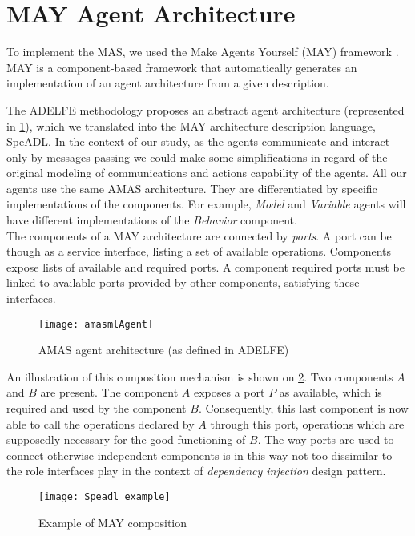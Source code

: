 \section{MAY Agent Architecture}

To implement the MAS, we used the Make Agents Yourself (MAY) framework  \cite{No2012.2}. MAY is a component-based framework that automatically generates an implementation of an agent architecture from a given description.

The ADELFE methodology proposes an abstract agent architecture (represented in \figurename{} \ref{AMAS-ML_agent}), which we translated into the MAY architecture description language, SpeADL. In the context of our study, as the agents communicate and interact only by messages passing we could make some simplifications in regard of the original modeling of communications and actions capability of the agents. All our agents use the same AMAS architecture. They are differentiated by specific implementations of the components. For example, \emph{Model} and \emph{Variable} agents will have different implementations of the \emph{Behavior} component.\\
The components of a MAY architecture are connected by \emph{ports}. A port can be though as a service interface, listing a set of available operations. Components expose lists of available and required ports. A component required ports must be linked to available ports provided by other components, satisfying these interfaces.

\begin{figure}
\centering
\texttt{[image: amasmlAgent]}
\caption{AMAS agent architecture (as defined in ADELFE)}\label{AMAS-ML_agent}
\end{figure}

An illustration of this composition mechanism is shown on \figurename{} \ref{Speadl_example}. Two components $A$ and $B$ are present. The component $A$ exposes a port $P$ as available, which is required and used by the component $B$. Consequently, this last component is now able to call the operations declared by $A$ through this port, operations which are supposedly necessary for the good functioning of $B$. The way ports are used to connect otherwise independent components is in this way not too dissimilar to the role interfaces play in the context of \emph{dependency injection} design pattern.

\begin{figure}
\centering
\texttt{[image: Speadl\_example]}
\caption{Example of MAY composition}\label{Speadl_example}
\end{figure}

